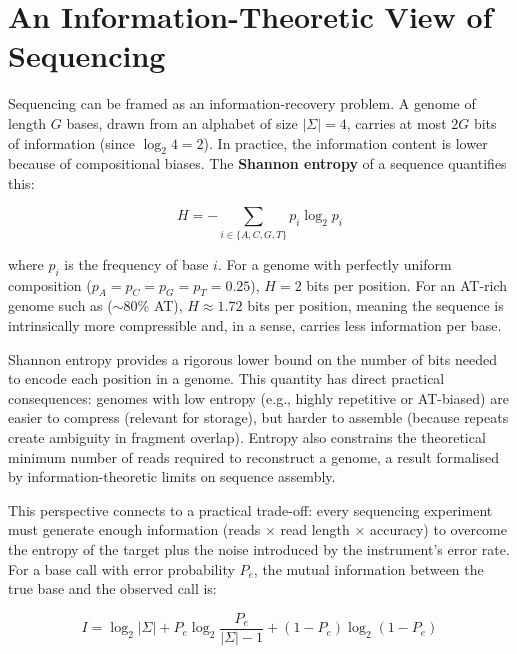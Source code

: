 \section{An Information-Theoretic View of Sequencing}
\label{sec:intro:information-theory}

Sequencing can be framed as an information-recovery problem. A genome of length $G$ bases, drawn from an alphabet of size $|\Sigma|=4$, carries at most $2G$ bits of information (since $\log_2 4 = 2$). In practice, the information content is lower because of compositional biases. The \textbf{Shannon entropy} of a sequence quantifies this:

\begin{equation}
H = -\sum_{i \in \{A,C,G,T\}} p_i \log_2 p_i
\label{eq:intro:shannon-entropy}
\end{equation}

where $p_i$ is the frequency of base $i$. For a genome with perfectly uniform composition ($p_A = p_C = p_G = p_T = 0.25$), $H = 2$ bits per position. For an AT-rich genome such as  ($\sim$80\% AT), $H \approx 1.72$ bits per position, meaning the sequence is intrinsically more compressible and, in a sense, carries less information per base.

\begin{keyconcept}[title={Shannon Entropy and Genome Complexity}]
Shannon entropy provides a rigorous lower bound on the number of bits needed to encode each position in a genome. This quantity has direct practical consequences: genomes with low entropy (e.g., highly repetitive or AT-biased) are easier to compress (relevant for storage), but harder to assemble (because repeats create ambiguity in fragment overlap). Entropy also constrains the theoretical minimum number of reads required to reconstruct a genome, a result formalised by information-theoretic limits on sequence assembly.
\end{keyconcept}

This perspective connects to a practical trade-off: every sequencing experiment must generate enough information (reads $\times$ read length $\times$ accuracy) to overcome the entropy of the target plus the noise introduced by the instrument's error rate. For a base call with error probability $P_e$, the mutual information between the true base and the observed call is:

\begin{equation}
I = \log_2 |\Sigma| + P_e \log_2 \frac{P_e}{|\Sigma|-1} + (1-P_e)\log_2(1-P_e)
\label{eq:intro:mutual-info}
\end{equation}

